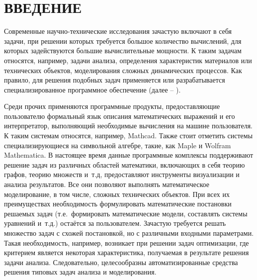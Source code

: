 \chapter*{ВВЕДЕНИЕ}\label{chap.introduction}
Современные научно-технические исследования зачастую включают в себя задачи, при решении которых требуется большое количество вычислений, для которых задействуются большие вычислительные мощности. К таким задачам относятся, например, задачи анализа, определения характеристик материалов или технических объектов, моделирования сложных динамических процессов. Как правило, для решения подобных задач применяется или разрабатывается специализированное программное обеспечение (далее -- ).

Среди прочих применяются программные продукты, предоставляющие пользователю формальный язык описания математических выражений и его интерпретатор, выполняющий необходимые вычисления на машине пользователя. К таким системам относятся, например, Mathcad. Также стоит отметить системы специализирующиеся на символьной алгебре, такие, как Maple\cite{CharMaple1983} и Wolfram Mathematica. В настоящее время данные программные комплексы поддерживают решение задач из различных областей математики, включающих в себя теорию графов, теорию множеств и~т.д, предоставляют инструменты визуализации и анализа результатов. Все они позволяют выполнять математическое моделирование, в том числе, сложных технических объектов. При всех их преимуществах необходимость формулировать математические постановки решаемых задач (т.е.~формировать математические модели, составлять системы уравнений и~т.д.) остаётся за пользователем. Зачастую требуется решать множество задач с схожей постановкой, но с различными входными параметрами. Такая необходимость, например, возникает при решении задач оптимизации, где критерием является некоторая характеристика, получаемая в результате решения задачи анализа. Следовательно, целесообразны автоматизированные средства решения типовых задач анализа и моделирования.

